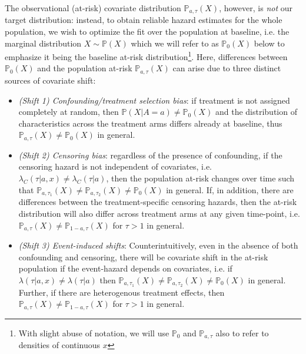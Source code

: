 \documentclass{article}
\newcommand{\minus}{{-}} %
\begin{document}
The observational (at-risk) covariate distribution $\mathbb{P}_{a,\tau}(X)$, however, is \textit{not} our target distribution:  instead, to obtain reliable hazard estimates for the whole population, we wish to optimize the fit over the population at baseline, i.e. the marginal distribution $X \sim \mathbb{P}(X)$ which we will refer to as  $\mathbb{P}_0(X)$ below to emphasize it being the baseline at-risk distribution\footnote{With slight abuse of notation, we will use $\mathbb{P}_0$ and $\mathbb{P}_{a,\tau}$ also to refer to densities of continuous $x$}. Here, differences between $\mathbb{P}_0(X)$ and the population at-risk $\mathbb{P}_{a,\tau}(X)$ can arise due to three distinct sources of covariate shift:
\begin{itemize}[leftmargin=5.5mm]
    \item \textit{(Shift 1) Confounding/treatment selection bias}: if treatment is not assigned completely at random, then $\mathbb{P}(X|A=a)\neq \mathbb{P}_0(X)$ and the distribution of characteristics across the treatment arms differs already at baseline, thus $\mathbb{P}_{a,\tau}(X)\neq \mathbb{P}_0(X)$ in general.
    \item \textit{(Shift 2) Censoring bias}: regardless of the presence of confounding, if the censoring hazard is not independent of covariates, i.e. $\lambda_C(\tau|a,x) \neq \lambda_C(\tau|a)$, then the population at-risk changes over time such that $\mathbb{P}_{a, \tau_1}(X) \neq \mathbb{P}_{a, \tau_2}(X) \neq\mathbb{P}_0(X)$ in general. If, in addition, there are differences between the treatment-specific censoring hazards, then the at-risk distribution will also differ across treatment arms at any given time-point, i.e. $\mathbb{P}_{a,\tau}(X) \neq \mathbb{P}_{1-a, \tau}(X)$ for $\tau>1$ in general. 
    \item \textit{(Shift 3) Event-induced shifts}: Counterintuitively, even in the absence of both confounding and censoring, there will be covariate shift in the at-risk population if the event-hazard depends on covariates, i.e. if $\lambda(\tau|a,x) \neq \lambda(\tau|a)$ then $\mathbb{P}_{a, \tau_1}(X) \neq \mathbb{P}_{a,\tau_2}(X) \neq\mathbb{P}_0(X)$ in general. Further, if there are heterogenous treatment effects, then $\mathbb{P}_{a,\tau}(X) \neq \mathbb{P}_{1\minus a, \tau}(X)$ for $\tau>1$ in general.
\end{itemize}
\end{document}
